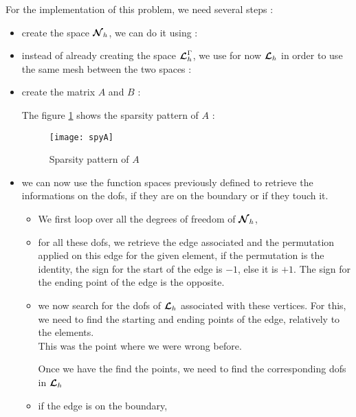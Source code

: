 For the implementation of this problem, we need several steps :
\begin{itemize}
\item
  create the space ${\bm{\mathcal{N}}}_h$, we can do it using :
  
\item
  instead of already creating the space ${\bm{\mathcal{L}}}_h^\Gamma$, we use for now ${\bm{\mathcal{L}}}_h$ in order to use the same mesh between the two spaces :
  
\item
  create the matrix $A$ and $B$ :
  
  The figure \ref{spyA} shows the sparsity pattern of $A$ : 
  \begin{figure}[H]
    \centering
    \texttt{[image: spyA]}
    \caption{Sparsity pattern of $A$}
    \label{spyA}
  \end{figure}
\item
  we can now use the function spaces previously defined to retrieve the
  informations on the dofs, if they are on the boundary or if they touch it.\\
  \begin{itemize}
  \item
    We first loop over all the degrees of freedom of ${\bm{\mathcal{N}}}_h$,
    
  \item
    for all these dofs, we retrieve the edge associated and the permutation applied on this edge for the given element, if the permutation is the identity, the sign for the start of the edge is $-1$, else it is $+1$. The sign for the ending point of the edge is the opposite.
    
  \item
    we now search for the dofs of ${\bm{\mathcal{L}}}_h$ associated with these vertices. For this, we need to find the starting and ending points of the edge, relatively to the elements.\\
    This was the point where we were wrong before.
    
    Once we have the find the points, we need to find the corresponding dofs in ${\bm{\mathcal{L}}}_h$
    
  \item
    if the edge is on the boundary,
    \begin{itemize}

\end{itemize}
\end{itemize}
\end{itemize}
